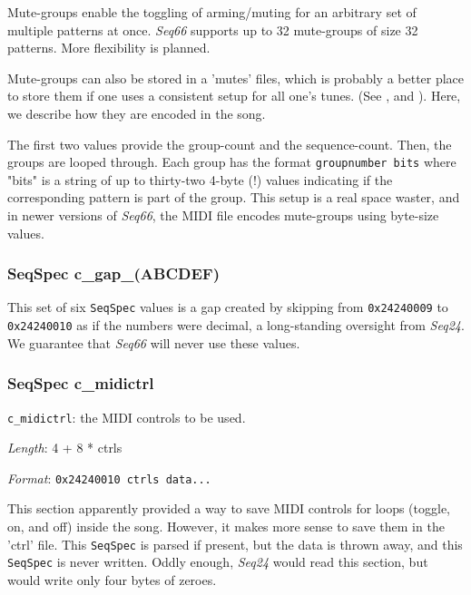    Mute-groups enable the toggling of arming/muting for an arbitrary set of
   multiple patterns at once.  \textsl{Seq66} supports up to 32 mute-groups of
   size 32 patterns.  More flexibility is planned.

   Mute-groups can also be stored in a 'mutes' files, which is probably a better
   place to store them if one uses a consistent setup for all one's tunes.
   (See , and
   ).
   Here, we describe how they are encoded in the song.

   The first two values provide the group-count and the sequence-count.
   Then, the groups are looped through. Each group has the format
   \texttt{groupnumber bits} where "bits" is a string of up to thirty-two
   4-byte (!) values indicating if the corresponding pattern is part of
   the group.  This setup is a real space waster, and in newer versions of
   \textsl{Seq66}, the MIDI file encodes mute-groups using byte-size values.

\subsubsection{SeqSpec c\_gap\_(ABCDEF)}
\label{subsubsec:midi_format_track_seqspec_gap_abcdef}

   This set of six
   \texttt{SeqSpec} values is a gap created by skipping from
   \texttt{0x24240009} to \texttt{0x24240010} as if the numbers were
   decimal, a long-standing oversight from \textsl{Seq24}.
   We guarantee that \textsl{Seq66} will never use these values.

\subsubsection{SeqSpec c\_midictrl}
\label{subsubsec:midi_format_track_seqspec_midictrl}

   \begin{description}
      \item \texttt{c\_midictrl}: the MIDI controls to be used.
      \item \textsl{Length}: 4 + 8 * ctrls
      \item \textsl{Format}: \texttt{0x24240010 ctrls data...}
   \end{description}
   
   This section apparently provided a way to save MIDI controls for loops
   (toggle, on, and off) inside the song.  However, it makes more sense to
   save them in the 'ctrl' file.  This
   \texttt{SeqSpec} is parsed if present, but
   the data is thrown away, and this
   \texttt{SeqSpec} is never written.
   Oddly enough, \textsl{Seq24} would read this section, but would write only
   four bytes of zeroes.

